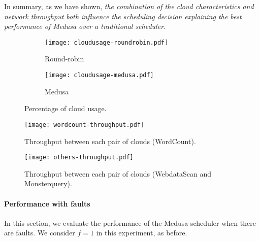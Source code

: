 \documentclass[10pt, conference, compsocconf]{IEEEtran}
\begin{document}
In summary, as we have shown, \textit{the combination of the cloud characteristics and network throughput both influence the scheduling decision explaining the best performance of Medusa over a traditional scheduler.}

\begin{figure}[t!]
  \centering
  \begin{subfigure}{.5\textwidth}
    \texttt{[image: cloudusage-roundrobin.pdf]}
    \vspace{-1.5\baselineskip}
    \caption{Round-robin}
    \label{fig:makespan:cloud:usage:rr}
  \end{subfigure}
  \vspace*{\fill} \begin{subfigure}{.5\textwidth}
      \texttt{[image: cloudusage-medusa.pdf]}
    \vspace{-1.5\baselineskip}
    \caption{Medusa}
    \label{fig:makespan:cloud:usage:medusa}
  \end{subfigure}
  \vspace{.5em}
  \caption{Percentage of cloud usage.}
  \label{fig:cloud:usage}
\end{figure}


\begin{figure}
  \centering
  \texttt{[image: wordcount-throughput.pdf]}
  \caption{Throughput between each pair of clouds (WordCount).}
  \label{eval:fig:throughput:wordcount}
\end{figure}

\begin{figure}
  \centering
  \texttt{[image: others-throughput.pdf]}
  \caption{Throughput between each pair of clouds (WebdataScan and Monsterquery).}
  \label{eval:fig:throughput:others}
  \vspace{1em}
\end{figure}











\paragraph{Performance with faults}

In this section, we evaluate the performance of the Medusa scheduler when there are faults.
We consider $f=1$ in this experiment, as before.
\end{document}
